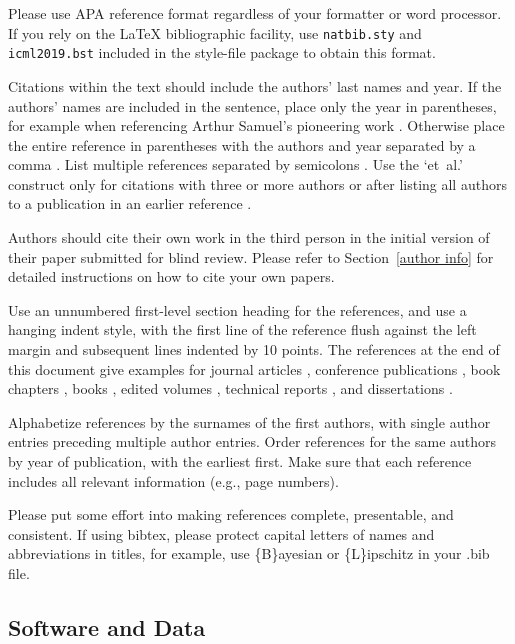 \documentclass{article}
\begin{document}
Please use APA reference format regardless of your formatter
or word processor. If you rely on the \LaTeX\/ bibliographic
facility, use \texttt{natbib.sty} and \texttt{icml2019.bst}
included in the style-file package to obtain this format.

Citations within the text should include the authors' last names and
year. If the authors' names are included in the sentence, place only
the year in parentheses, for example when referencing Arthur Samuel's
pioneering work . Otherwise place the entire
reference in parentheses with the authors and year separated by a
comma \cite{Samuel59}. List multiple references separated by
semicolons \cite{kearns89,Samuel59,mitchell80}. Use the `et~al.'
construct only for citations with three or more authors or after
listing all authors to a publication in an earlier reference \cite{MachineLearningI}.

Authors should cite their own work in the third person
in the initial version of their paper submitted for blind review.
Please refer to Section~\ref{author info} for detailed instructions on how to
cite your own papers.

Use an unnumbered first-level section heading for the references, and use a
hanging indent style, with the first line of the reference flush against the
left margin and subsequent lines indented by 10 points. The references at the
end of this document give examples for journal articles \cite{Samuel59},
conference publications \cite{langley00}, book chapters \cite{Newell81}, books
\cite{DudaHart2nd}, edited volumes \cite{MachineLearningI}, technical reports
\cite{mitchell80}, and dissertations \cite{kearns89}.

Alphabetize references by the surnames of the first authors, with
single author entries preceding multiple author entries. Order
references for the same authors by year of publication, with the
earliest first. Make sure that each reference includes all relevant
information (e.g., page numbers).

Please put some effort into making references complete, presentable, and
consistent. If using bibtex, please protect capital letters of names and
abbreviations in titles, for example, use \{B\}ayesian or \{L\}ipschitz
in your .bib file.

\subsection{Software and Data}
\end{document}
